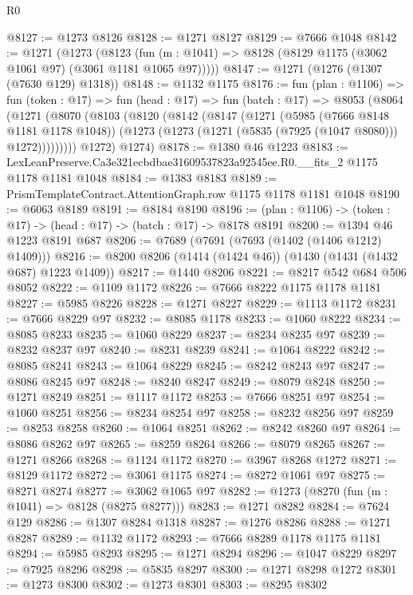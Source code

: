 \begin{lexlean}{R0}
\begin{coremodule}
@8127 := @1273 @8126
@8128 := @1271 @8127
@8129 := @7666 @1048
@8142 := @1271
    (@1273
      (@8123 (fun (m : @1041) => @8128 (@8129 @1175 (@3062 @1061 @97) (@3061 @1181 @1065 @97)))))
@8147 := @1271 (@1276 (@1307 (@7630 @129) @1318))
@8148 := @1132 @1175
@8176 := fun (plan : @1106) =>
  fun (token : @17) =>
  fun (head : @17) =>
  fun (batch : @17) =>
  @8053
    (@8064
      (@1271
        (@8070
          (@8103
            (@8120
              (@8142
                (@8147
                  (@1271
                    (@5985 (@7666 @8148 @1181 @1178 @1048))
                    (@1273 (@1273 (@1271 (@5835 (@7925 (@1047 @8080))) @1272)))))))))
        @1272)
      @1274)
@8178 := @1380 @46 @1223
@8183 := LexLeanPreserve.Ca3e321ecbdbae31609537823a92545ee.R0.__fits_2 @1175 @1178 @1181 @1048
@8184 := @1383 @8183
@8189 := PrismTemplateContract.AttentionGraph.row @1175 @1178 @1181 @1048
@8190 := @6063 @8189
@8191 := @8184 @8190
@8196 := (plan : @1106) -> (token : @17) -> (head : @17) -> (batch : @17) -> @8178 @8191
@8200 := @1394 @46 @1223 @8191 @687
@8206 := @7689 (@7691 (@7693 (@1402 (@1406 @1212) @1409)))
@8216 := @8200 @8206 (@1414 (@1424 @46)) (@1430 (@1431 (@1432 @687) @1223 @1409))
@8217 := @1440 @8206
@8221 := @8217 @542 @684 @506 @8052
@8222 := @1109 @1172
@8226 := @7666 @8222 @1175 @1178 @1181
@8227 := @5985 @8226
@8228 := @1271 @8227
@8229 := @1113 @1172
@8231 := @7666 @8229 @97
@8232 := @8085 @1178
@8233 := @1060 @8222
@8234 := @8085 @8233
@8235 := @1060 @8229
@8237 := @8234 @8235 @97
@8239 := @8232 @8237 @97
@8240 := @8231 @8239
@8241 := @1064 @8222
@8242 := @8085 @8241
@8243 := @1064 @8229
@8245 := @8242 @8243 @97
@8247 := @8086 @8245 @97
@8248 := @8240 @8247
@8249 := @8079 @8248
@8250 := @1271 @8249
@8251 := @1117 @1172
@8253 := @7666 @8251 @97
@8254 := @1060 @8251
@8256 := @8234 @8254 @97
@8258 := @8232 @8256 @97
@8259 := @8253 @8258
@8260 := @1064 @8251
@8262 := @8242 @8260 @97
@8264 := @8086 @8262 @97
@8265 := @8259 @8264
@8266 := @8079 @8265
@8267 := @1271 @8266
@8268 := @1124 @1172
@8270 := @3967 @8268 @1272
@8271 := @8129 @1172
@8272 := @3061 @1175
@8274 := @8272 @1061 @97
@8275 := @8271 @8274
@8277 := @3062 @1065 @97
@8282 := @1273 (@8270 (fun (m : @1041) => @8128 (@8275 @8277)))
@8283 := @1271 @8282
@8284 := @7624 @129
@8286 := @1307 @8284 @1318
@8287 := @1276 @8286
@8288 := @1271 @8287
@8289 := @1132 @1172
@8293 := @7666 @8289 @1178 @1175 @1181
@8294 := @5985 @8293
@8295 := @1271 @8294
@8296 := @1047 @8229
@8297 := @7925 @8296
@8298 := @5835 @8297
@8300 := @1271 @8298 @1272
@8301 := @1273 @8300
@8302 := @1273 @8301
@8303 := @8295 @8302

\end{coremodule}
\end{lexlean}
